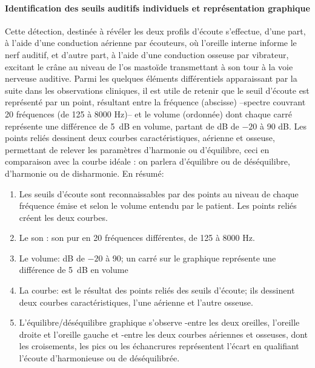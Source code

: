 \paragraph{Identification des seuils auditifs individuels et représentation graphique}

Cette détection, destinée à révéler les deux profils d'écoute
s'effectue, d'une part, à l'aide d'une
conduction aérienne par écouteurs, où l'oreille interne
informe le nerf auditif,  et d'autre part, à l'aide
d'une conduction osseuse par vibrateur, excitant le crâne au
niveau de l'os mastoïde transmettant à son tour à  la voie nerveuse
auditive.
Parmi les quelques éléments différentiels
apparaissant par la suite dans les observations cliniques, il est utile de retenir
que le seuil d'écoute est représenté par un point, résultant entre la
fréquence (abscisse) --spectre couvrant 20
fréquences (de 125 à 8000 Hz)--   et le volume
(ordonnée) dont chaque carré représente une différence de \SI{5}{\dB} en
volume, partant de dB de $-20$ à 90 dB.
Les points reliés dessinent deux courbes caractéristiques, aérienne
et osseuse, permettant de relever les paramètres d'harmonie ou
          d'équilibre, ceci
 	en comparaison avec la courbe idéale : on parlera
        d'équilibre ou de
 	déséquilibre, d'harmonie ou de disharmonie. 	
 	En résumé: 
        \begin{enumerate}
 \item   Les seuils d'écoute sont reconnaissables par des points au niveau de
          chaque fréquence émise et selon le volume entendu par le
          patient. Les points reliés créent les deux courbes.
 	\item Le son : son pur en 20 fréquences différentes, de 125 à 8000 Hz.
 	\item Le volume: dB de $-20$ à 90; un carré sur le graphique représente une différence de \SI{5}{\dB} en
 		volume
 	\item La courbe: est le résultat des points reliés des seuils
          d'écoute; ils
          dessinent deux courbes caractéristiques, l'une aérienne et l'autre osseuse.
\item L'équilibre/déséquilibre graphique s'observe
        -entre les deux oreilles, l'oreille droite et l'oreille gauche
        et
        -entre les deux courbes aériennes et osseuses, dont les
        croisements, les pics ou les échancrures représentent
        l'écart en
        qualifiant l'écoute d'harmonieuse ou de
        déséquilibrée.
      \end{enumerate}

